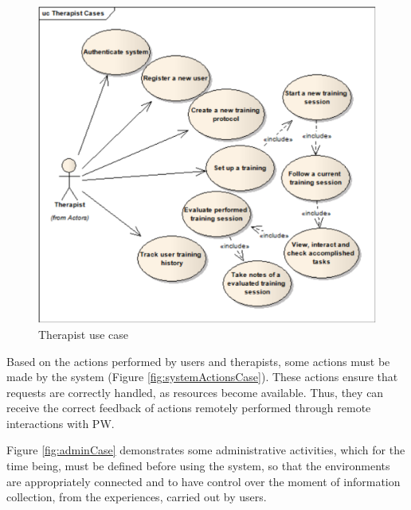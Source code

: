 \begin{figure}[!hbt]
\begin{center}
\includegraphics[width=0.55\linewidth]{img/cap4/therapistCases}
\caption{Therapist use case} \label{fig:therapistCases}
\end{center}
\end{figure}

Based on the actions performed by users and therapists, some actions must be made by the system (Figure \ref {fig:systemActionsCase}). These actions ensure that requests are correctly handled, as resources become available. Thus, they can receive the correct feedback of actions remotely performed through remote interactions with PW.

Figure \ref {fig:adminCase} demonstrates some administrative activities, which for the time being, must be defined before using the system, so that the environments are appropriately connected and to have control over the moment of information collection, from the experiences, carried out by users.

